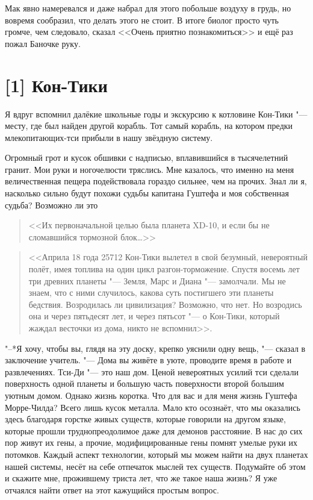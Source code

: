 Мак явно намеревался и даже набрал для этого побольше воздуху в грудь, но вовремя сообразил, что делать этого не стоит.
В итоге биолог просто чуть громче, чем следовало, сказал <<Очень приятно познакомиться>> и ещё раз пожал Баночке руку.

\section{[1] Кон-Тики}

Я вдруг вспомнил далёкие школьные годы и экскурсию к котловине Кон-Тики "--- месту, где был найден другой корабль.
Тот самый корабль, на котором предки млекопитающих-тси прибыли в нашу звёздную систему.

Огромный грот и кусок обшивки с надписью, вплавившийся в тысячелетний гранит.
Мои руки и ногочелюсти тряслись.
Мне казалось, что именно на меня величественная пещера подействовала гораздо сильнее, чем на прочих.
Знал ли я, насколько сильно будут похожи судьбы капитана Гуштефа и моя собственная судьба?
Возможно ли это\ldotsq

\begin{quote}
<<Их первоначальной целью была планета XD-10, и если бы не сломавшийся тормозной блок\ldots>>
\end{quote}

\begin{quote}
<<\ldotst Априла 18 года 25712 Кон-Тики вылетел в свой безумный, невероятный полёт, имея топлива на один цикл разгон-торможение.
Спустя восемь лет три древних планеты "--- Земля, Марс и Диана "--- замолчали.
Мы не знаем, что с ними случилось, какова суть постигшего эти планеты бедствия.
Возродилась ли цивилизация?
Возможно, что нет.
Но возродись она и через пятьдесят лет, и через пятьсот "--- о Кон-Тики, который жаждал весточки из дома, никто не вспомнил>>.
\end{quote}

"--*Я хочу, чтобы вы, глядя на эту доску, крепко уяснили одну вещь, "--- сказал в заключение учитель.
"--- Дома вы живёте в уюте, проводите время в работе и развлечениях.
Тси-Ди "--- это наш дом.
Ценой невероятных усилий тси сделали поверхность одной планеты и большую часть поверхности второй большим уютным домом.
Однако жизнь коротка.
Что для вас и для меня жизнь Гуштефа Морре-Чилда?
Всего лишь кусок металла.
Мало кто осознаёт, что мы оказались здесь благодаря горстке живых существ, которые говорили на другом языке, которые прошли труднопреодолимое даже для демонов расстояние.
В нас до сих пор живут их гены, а прочие, модифицированные гены помнят умелые руки их потомков.
Каждый аспект технологии, который мы можем найти на двух планетах нашей системы, несёт на себе отпечаток мыслей тех существ.
Подумайте об этом и скажите мне, прожившему триста лет, что же такое наша жизнь?
Я уже отчаялся найти ответ на этот кажущийся простым вопрос.

